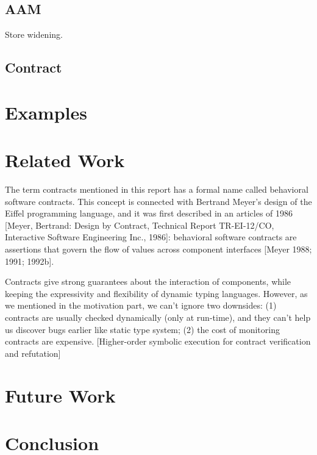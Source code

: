 \documentclass[paper=a4, fontsize=11pt]{scrartcl} %
\numberwithin{equation}{section} %
\numberwithin{figure}{section} %
\numberwithin{table}{section} %
\begin{document}
\subsection{AAM}
Store widening.

\subsection{Contract}


\section{Examples}


\section{Related Work}
The term contracts mentioned in this report has a formal name called behavioral software contracts. This concept is connected with Bertrand Meyer's design of the Eiffel programming language, and it was first described in an articles of 1986 [Meyer, Bertrand: Design by Contract, Technical Report TR-EI-12/CO, Interactive Software Engineering Inc., 1986]: behavioral software contracts are assertions that govern the flow of values across component interfaces [Meyer 1988; 1991; 1992b].

Contracts give strong guarantees about the interaction of components, while keeping the expressivity and flexibility of dynamic typing languages. However, as we mentioned in the motivation part, we can't ignore two downsides: (1) contracts are usually checked dynamically (only at run-time), and they can't help us discover bugs earlier like static type system; (2) the cost of monitoring contracts are expensive. [Higher-order symbolic execution for contract verification and refutation]



\section{Future Work}

\section{Conclusion}
\end{document}
